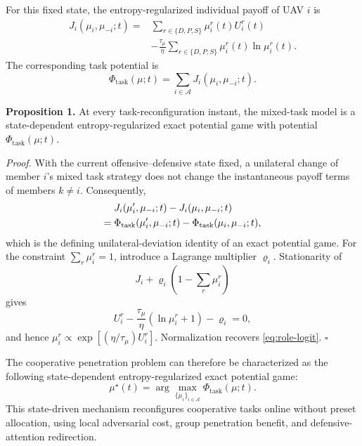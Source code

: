 \documentclass{cja}
\begin{document}
For this fixed state, the entropy-regularized individual payoff of UAV $i$ is
\begin{equation}
\begin{aligned}
J_i(\mu_i,\mu_{-i};t)
={}&
\sum_{r\in\{D,P,S\}}\mu_i^r(t)U_i^r(t)\\
&-\frac{\tau_\mu}{\eta}
\sum_{r\in\{D,P,S\}}\mu_i^r(t)\ln\mu_i^r(t).
\end{aligned}
\end{equation}
The corresponding task potential is
\begin{equation}
\Phi_{\mathrm{task}}(\mu;t)
=
\sum_{i\in\mathcal A}J_i(\mu_i,\mu_{-i};t).
\end{equation}

\noindent\textbf{Proposition 1.} At every task-reconfiguration instant, the mixed-task model is a state-dependent entropy-regularized exact potential game with potential $\Phi_{\mathrm{task}}(\mu;t)$.

\noindent\textit{Proof.} With the current offensive--defensive state fixed, a unilateral change of member $i$'s mixed task strategy does not change the instantaneous payoff terms of members $k\ne i$. Consequently,
\begin{align}
&J_i(\mu_i',\mu_{-i};t)-J_i(\mu_i,\mu_{-i};t)\notag\\
={}&\Phi_{\mathrm{task}}(\mu_i',\mu_{-i};t)
-\Phi_{\mathrm{task}}(\mu_i,\mu_{-i};t),
\end{align}
which is the defining unilateral-deviation identity of an exact potential game. For the constraint $\sum_r\mu_i^r=1$, introduce a Lagrange multiplier $\varrho_i$. Stationarity of
\begin{equation*}
J_i+\varrho_i\left(1-\sum_r\mu_i^r\right)
\end{equation*}
gives
\begin{equation*}
U_i^r-\frac{\tau_\mu}{\eta}\left(\ln\mu_i^r+1\right)-\varrho_i=0,
\end{equation*}
and hence $\mu_i^r\propto\exp[(\eta/\tau_\mu)U_i^r]$. Normalization recovers \eqref{eq:role-logit}. \hfill$\square$

The cooperative penetration problem can therefore be characterized as the following state-dependent entropy-regularized exact potential game:
\begin{equation}
\mu^{\star}(t)
=
\arg\max_{\{\mu_i\}_{i\in\mathcal{A}}}
\Phi_{\mathrm{task}}(\mu;t).
\end{equation}
This state-driven mechanism reconfigures cooperative tasks online without preset allocation, using local adversarial cost, group penetration benefit, and defensive-attention redirection.
\end{document}
